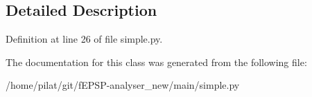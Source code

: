 \subsection{Detailed Description}


Definition at line 26 of file simple.\-py.



The documentation for this class was generated from the following file\-:\begin{DoxyCompactItemize}
\item 
/home/pilat/git/f\-E\-P\-S\-P-\/analyser\-\_\-new/main/simple.\-py\end{DoxyCompactItemize}
